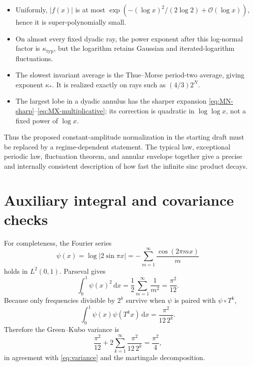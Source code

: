 \documentclass[11pt,oneside]{article}
\theoremstyle{definition}
\theoremstyle{remark}
\newcommand{\dd}{\,\mathrm d}
\newcommand{\bigO}{\mathcal O}
\newcommand{\T}{T}
\begin{document}
\begin{itemize}
\item Uniformly, $|f(x)|$ is at most
      $\exp(-(\log x)^2/(2\log2)+\bigO(\log x))$, hence it is
      super-polynomially small.
\item On almost every fixed dyadic ray, the power exponent after this
      log-normal factor is $\kappa_{\mathrm{typ}}$, but the logarithm retains
      Gaussian and iterated-logarithm fluctuations.
\item The slowest invariant average is the Thue--Morse period-two average,
      giving exponent $\kappa_*$.  It is realized exactly on rays such as
      $(4/3)2^N$.
\item The largest lobe in a dyadic annulus has the sharper expansion
      \eqref{eq:MN-sharp}--\eqref{eq:MX-multiplicative}; its correction is
      quadratic in $\log\log x$, not a fixed power of $\log x$.
\end{itemize}

Thus the proposed constant-amplitude normalization in the starting draft must
be replaced by a regime-dependent statement.  The typical law, exceptional
periodic law, fluctuation theorem, and annular envelope together give a precise
and internally consistent description of how fast the infinite sinc product
decays.

\appendix

\section{Auxiliary integral and covariance checks}

For completeness, the Fourier series
\begin{equation}
 \psi(x)=\log|2\sin\pi x|
 =-\sum_{m=1}^{\infty}\frac{\cos(2\pi mx)}{m}              \label{eq:psi-fourier}
\end{equation}
holds in $L^2(0,1)$.  Parseval gives
\begin{equation}
 \int_0^1\psi(x)^2\dd x=\frac12\sum_{m=1}^{\infty}\frac1{m^2}
 =\frac{\pi^2}{12}.                                        \label{eq:psi-var}
\end{equation}
Because only frequencies divisible by $2^k$ survive when
$\psi$ is paired with $\psi\circ\T^k$,
\begin{equation}
 \int_0^1\psi(x)\psi(\T^kx)\dd x
 =\frac{\pi^2}{12\,2^k}.                                  \label{eq:covariance}
\end{equation}
Therefore the Green--Kubo variance is
\begin{equation}
 \frac{\pi^2}{12}
 +2\sum_{k=1}^{\infty}\frac{\pi^2}{12\,2^k}
 =\frac{\pi^2}{4},                                         \label{eq:green-kubo}
\end{equation}
in agreement with \eqref{eq:variance} and the martingale decomposition.
\end{document}
